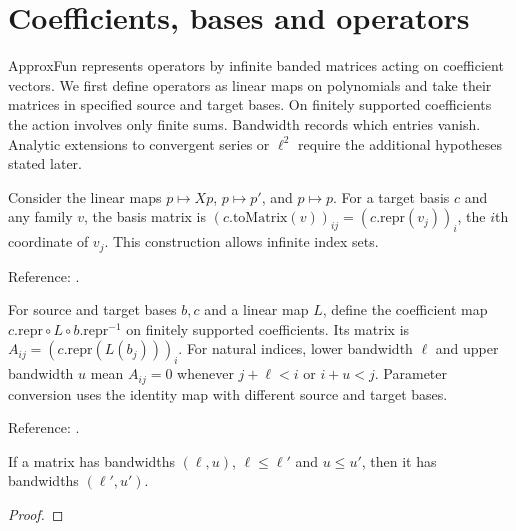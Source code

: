 \chapter{Coefficients, bases and operators}\label{chap:operators}

ApproxFun \cite{approxfun-jl,approxfun} represents operators by infinite banded matrices acting on
coefficient vectors. We first define operators as linear maps on polynomials
and take their matrices in specified source and target bases. On finitely
supported coefficients the action involves only finite sums. Bandwidth
records which entries vanish. Analytic extensions to convergent series or
$\ell^2$ require the additional hypotheses stated later.

\begin{supporting}
\begin{definition}
\label{def:polynomial-linear-maps}
\mathlibok
Consider the linear maps $p\mapsto Xp$, $p\mapsto p'$, and $p\mapsto p$.
For a target basis $c$ and any family $v$, the basis matrix is
$(c.\mathrm{toMatrix}(v))_{ij}=(c.\mathrm{repr}(v_j))_i$, the $i$th coordinate of $v_j$.
This construction allows infinite index sets.

Reference: \cite[\S2]{olver-townsend}.
\end{definition}
\end{supporting}


\begin{definition}
\label{def:operators}
\leanok
For source and target bases $b,c$ and a linear map $L$, define the coefficient
map $c.\mathrm{repr}\circ L\circ b.\mathrm{repr}^{-1}$ on finitely supported
coefficients. Its matrix is $A_{ij}=(c.\mathrm{repr}(L(b_j)))_i$.
For natural indices, lower bandwidth $\ell$ and upper bandwidth $u$ mean
$A_{ij}=0$ whenever $j+\ell<i$ or $i+u<j$.
Parameter conversion uses the identity map with different source and target bases.

Reference: \cite[\S2]{olver-townsend}.
\end{definition}

\begin{supporting}
\begin{theorem}
\label{thm:bandwidth-mono}
\leanok
If a matrix has bandwidths $(\ell,u)$, $\ell\le\ell'$ and $u\le u'$, then it
has bandwidths $(\ell',u')$.
\end{theorem}
\begin{proof}
\leanok
\end{proof}
\end{supporting}


